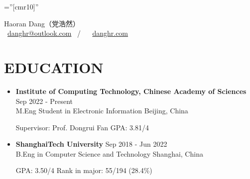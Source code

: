 \documentclass[a4paper,10pt]{ctexart} %
\begin{document}
\pagestyle{empty} %

\font\fb=''[cmr10]'' %



\begin{center}
    {\LARGE Haoran Dang}（党浩然） \\
     \  \href{mailto:danghr@outlook.com}{danghr@outlook.com} \  / \   \  \href{https://www.danghr.com}{danghr.com} \\
\end{center}



\section{EDUCATION}

    \begin{itemize}
        \item \textbf{Institute of Computing Technology, Chinese Academy of Sciences} \hfill Sep 2022 - Present \\
        M.Eng Student in Electronic Information \hfill Beijing, China \\
        \begin{small}
            Supervisor: Prof. Dongrui Fan \quad
            GPA: 3.81/4 \quad
        \end{small}
        \item \textbf{ShanghaiTech University} \hfill Sep 2018 - Jun 2022\\
        B.Eng in Computer Science and Technology \hfill Shanghai, China \\
        \begin{small}
            GPA: 3.50/4 \quad Rank in major: 55/194 (28.4\%) \quad
       \end{small}
    \end{itemize}


\end{document}
